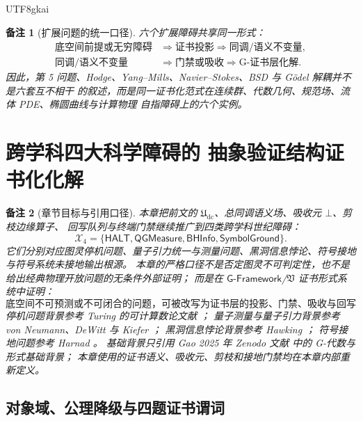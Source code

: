 \documentclass[12pt]{article}
\newtheorem{remark}{备注}[section]
\newcommand{\GFramework}{\textsf{G-Framework}}
\newcommand{\Udc}{\mathfrak{U}_{\mathrm{dc}}}
\newcommand{\Vsys}{\mathfrak V}
\begin{document}
\begin{CJK*}{UTF8}{gkai}
\begin{remark}[扩展问题的统一口径]
六个扩展障碍共享同一形式：
\[
  \begin{aligned}
  \text{底空间前提或无穷障碍}
  &\Longrightarrow
  \text{证书投影}
  \Longrightarrow
  \text{同调/语义不变量},\\
  \text{同调/语义不变量}
  &\Longrightarrow
  \text{门禁或吸收}
  \Longrightarrow
  \text{G-证书层化解}.
  \end{aligned}
\]
因此，第 5 问题、Hodge、Yang--Mills、Navier--Stokes、BSD 与 Gödel 解耦并不是六套互不相干
的叙述，而是同一证书化范式在连续群、代数几何、规范场、流体 PDE、椭圆曲线与计算物理
自指障碍上的六个实例。
\end{remark}

\section{跨学科四大科学障碍的 抽象验证结构证书化化解}
\label{sec:tex59-crossdisciplinary-obstructions}

\begin{remark}[章节目标与引用口径]
本章把前文的 \(\Udc\)、总同调语义场、吸收元 \(\bot\)、剪枝边缘算子、
回写队列与终端门禁继续推广到四类跨学科世纪障碍：
\[
  \mathcal X_4
  =
  \{\mathsf{HALT},\mathsf{QGMeasure},\mathsf{BHInfo},\mathsf{SymbolGround}\}.
\]
它们分别对应图灵停机问题、量子引力统一与测量问题、黑洞信息悖论、符号接地与符号系统未接地输出根源。
本章的严格口径不是否定图灵不可判定性，也不是给出经典物理开放问题的无条件外部证明；
而是在 \(\GFramework{}\)/\(\Vsys\) 证书形式系统中证明：
\[
  \boxed{
  \text{底空间不可预测或不可闭合的问题，可被改写为证书层的投影、门禁、吸收与回写问题。}
  }
\]
停机问题背景参考 Turing 的可计算数论文献 \cite{Turing1936Computable}；
量子测量与量子引力背景参考 von Neumann、DeWitt 与 Kiefer
\cite{VonNeumann1955Quantum,DeWitt1967QuantumGravity,Kiefer2012QuantumGravity}；
黑洞信息悖论背景参考 Hawking \cite{Hawking1976Breakdown}；
符号接地问题参考 Harnad \cite{Harnad1990SymbolGrounding}。
基础背景只引用 Gao 2025 年 Zenodo 文献 \cite{Gao2025PureMathZenodo} 中的 G-代数与形式基础背景；
本章使用的证书语义、吸收元、剪枝和接地门禁均在本章内部重新定义。
\end{remark}

\subsection{对象域、公理降级与四题证书谓词}
\label{subsec:tex59-cross-objects}


\end{CJK*}
\end{document}
